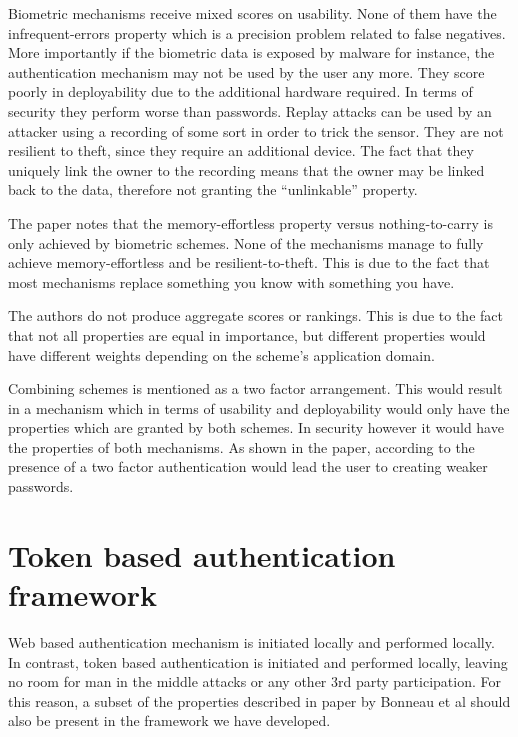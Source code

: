 Biometric mechanisms receive mixed scores on usability. None of them have the infrequent-errors property which is a precision problem related to false negatives. More importantly if the biometric data is exposed by malware for instance, the authentication mechanism may not be used by the user any more. They score poorly in deployability due to the additional hardware required. In terms of security they perform worse than passwords. Replay attacks can be used by an attacker using a recording of some sort in order to trick the sensor. They are not resilient to theft, since they require an additional device. The fact that they uniquely link the owner to the recording means that the owner may be linked back to the data, therefore not granting the ``unlinkable'' property. 

The paper notes that the memory-effortless property versus nothing-to-carry is only achieved by biometric schemes. None of the mechanisms manage to fully achieve memory-effortless and be resilient-to-theft. This is due to the fact that most mechanisms replace something you know with something you have.

The authors do not produce aggregate scores or rankings. This is due to the fact that not all properties are equal in importance, but different properties would have different weights depending on the scheme's application domain. 

Combining schemes is mentioned as a two factor arrangement. This would result in a mechanism which in terms of usability and deployability would only have the properties which are granted by both schemes. In security however it would have the properties of both mechanisms. As shown in the paper, according to \cite{wimberly2011using} the presence of a two factor authentication would lead the user to creating weaker passwords.

\section{Token based authentication framework}
Web based authentication mechanism is initiated locally and performed locally. In contrast, token based authentication is initiated and performed locally, leaving no room for man in the middle attacks or any other 3rd party participation. For this reason, a subset of the properties described in paper \cite{bonneau2012quest} by Bonneau et al should also be present in the framework we have developed.

